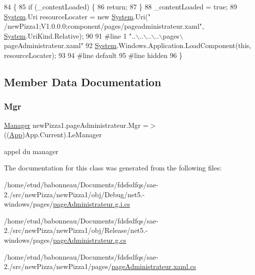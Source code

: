 \begin{DoxyCode}
84                                           \{
85             \textcolor{keywordflow}{if} (\_contentLoaded) \{
86                 \textcolor{keywordflow}{return};
87             \}
88             \_contentLoaded = \textcolor{keyword}{true};
89             \hyperlink{namespaceSystem}{System}.Uri resourceLocater = \textcolor{keyword}{new} \hyperlink{namespaceSystem}{System}.Uri(\textcolor{stringliteral}{"
      /newPizza1;V1.0.0.0;component/pages/pageadministrateur.xaml"}, \hyperlink{namespaceSystem}{System}.UriKind.Relative);
90             
91 \textcolor{preprocessor}{            #line 1 "..\(\backslash\)..\(\backslash\)..\(\backslash\)..\(\backslash\)pages\(\backslash\)pageAdministrateur.xaml"}
92             \hyperlink{namespaceSystem}{System}.Windows.Application.LoadComponent(\textcolor{keyword}{this}, resourceLocater);
93             
94 \textcolor{preprocessor}{            #line default}
95 \textcolor{preprocessor}{            #line hidden}
96         \}
\end{DoxyCode}


\subsection{Member Data Documentation}
\mbox{\label{classnewPizza1_1_1pageAdministrateur_a875c5374259f61887e976a3ba2d6c2e1}} 
\subsubsection{\texorpdfstring{Mgr}{Mgr}}
{\footnotesize\ttfamily \hyperlink{classModele_1_1Manager}{Manager} new\+Pizza1.\+page\+Administrateur.\+Mgr =$>$ ((\hyperlink{classnewPizza1_1_1App}{App})App.\+Current).Le\+Manager}



appel du manager 



The documentation for this class was generated from the following files\+:\begin{DoxyCompactItemize}
\item 
/home/etud/babonneau/\+Documents/fdsfsdfqs/sae-\/2./src/new\+Pizza/new\+Pizza1/obj/\+Debug/net5.-\/windows/pages/\hyperlink{net5_80-windows_2pages_2pageAdministrateur_8g_8i_8cs}{page\+Administrateur.\+g.\+i.\+cs}\item 
/home/etud/babonneau/\+Documents/fdsfsdfqs/sae-\/2./src/new\+Pizza/new\+Pizza1/obj/\+Release/net5.-\/windows/pages/\hyperlink{pageAdministrateur_8g_8cs}{page\+Administrateur.\+g.\+cs}\item 
/home/etud/babonneau/\+Documents/fdsfsdfqs/sae-\/2./src/new\+Pizza/new\+Pizza1/pages/\hyperlink{pageAdministrateur_8xaml_8cs}{page\+Administrateur.\+xaml.\+cs}\end{DoxyCompactItemize}
